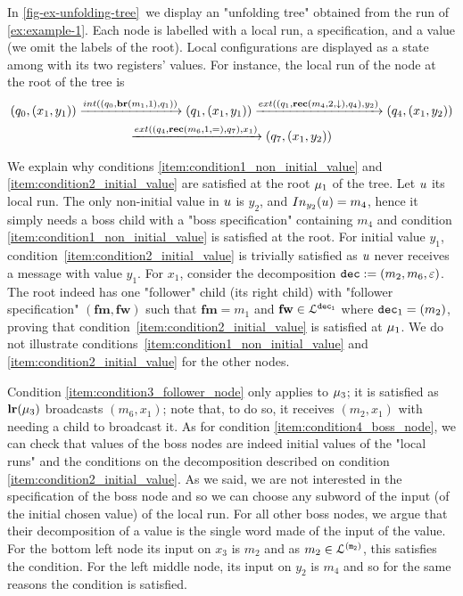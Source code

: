 \begin{example}
	In \cref{fig-ex-unfolding-tree}~we display an "unfolding tree" obtained from the run of \cref{ex:example-1}. Each node is labelled with a local run, a specification, and a value (we omit the labels of the root). Local configurations are displayed as a state among with its two registers' values. For instance, the local run of the node at the root of the tree is \begin{multline*}
	(q_0, (x_1,y_1)) \intstep{(q_0, \br{m_1}{1},q_1)} (q_1, (x_1, y_1)) \extbr{(q_1, \rec{m_4}{2}{\enregact}, q_4)}{y_2} (q_4, (x_1, y_2)) \\ \extbr{(q_4, \rec{m_6}{1}{\eqtestact}, q_7)}{x_1} (q_7, (x_1, y_2)) \end{multline*}
	
	We explain why conditions \ref{item:condition1_non_initial_value} and \ref{item:condition2_initial_value} are satisfied at the root $\mu_1$ of the tree. Let $u$ its local run.
	The only non-initial value in $u$ is $y_2$, and $\vinput{y_2}{\localrun} = m_4$, hence it simply needs a boss child with a "boss specification" containing $m_4$ and condition \ref{item:condition1_non_initial_value} is satisfied at the root. 
	For initial value $y_1$, condition~\ref{item:condition2_initial_value} is trivially satisfied as $u$ never receives a message with value $y_1$. For $x_1$, consider the decomposition $\mathtt{dec} := (m_2, m_6, \varepsilon)$. The root indeed has one "follower" child (its right child)  with "follower specification" $(\mathbf{fm}, \mathbf{fw})$ such that $\mathbf{fm} = m_1$ and $\mathbf{fw} \in \mathcal{L}^{\mathtt{\mathtt{dec}_1}}$ where $\mathtt{dec}_1 = (m_2)$, proving that condition~\ref{item:condition2_initial_value} is satisfied at $\mu_1$. We do not illustrate conditions~\ref{item:condition1_non_initial_value} and \ref{item:condition2_initial_value} for the other nodes. 
	
	Condition \ref{item:condition3_follower_node} only applies to $\mu_3$; it is satisfied as $\mathbf{lr}(\mu_3)$ broadcasts $(m_6,x_1)$; note that, to do so, it receives $(m_2,x_1)$ with needing a child to broadcast it. 
	As for condition \ref{item:condition4_boss_node},  we can check that values of the boss nodes are indeed initial values of the "local runs" and the conditions on the decomposition described on condition \ref{item:condition2_initial_value}. As we said, we are not interested in the specification of the boss node and so we can choose any subword of the input (of the initial chosen value) of the local run. For all other boss nodes, we argue that their decomposition of a value is the single word made of the input of the value. For the bottom left node its input on $x_3$ is $m_2$ and as $m_2 \in \mathcal{L}^{\mathtt{(m_2)}}$, this satisfies the condition. For the left middle node, its input on $y_2$ is $m_4$ and so for the same reasons the condition is satisfied.
	

\end{example}
